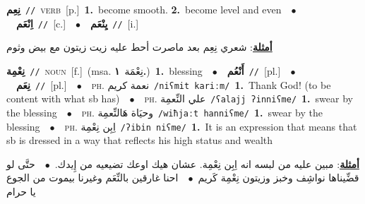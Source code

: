 \documentclass[10pt,a4paper,twoside]{article} %
\begin{document}
\begin{multicols}{2}
{\setlength\topsep{0pt}\textbf{\foreignlanguage{arabic}{نِعِم}}\ {\color{gray}\texttt{//}\color{black}}\ \textsc{verb}\ [p.]\ \textbf{1.}~become smooth.  \textbf{2.}~become level and even\ \ $\bullet$\ \ \setlength\topsep{0pt}\textbf{\foreignlanguage{arabic}{اِنْعَم}}\ {\color{gray}\texttt{//}\color{black}}\ [c.]\ \ $\bullet$\ \ \setlength\topsep{0pt}\textbf{\foreignlanguage{arabic}{يِنْعَم}}\ {\color{gray}\texttt{//}\color{black}}\ [i.]\  \begin{flushright}\color{gray}\foreignlanguage{arabic}{\textbf{\underline{\foreignlanguage{arabic}{أمثلة}}}: شعري نِعِم بعد ماصرت أحط عليه زيت زيتون مع بيض وثوم}\end{flushright}\color{black}} \vspace{2mm}

{\setlength\topsep{0pt}\textbf{\foreignlanguage{arabic}{نِعْمِة}}\ {\color{gray}\texttt{//}\color{black}}\ \textsc{noun}\ [f.]\ \color{gray}(msa. \foreignlanguage{arabic}{نِعْمَة}~\foreignlanguage{arabic}{\textbf{١.}})\color{black}\ \textbf{1.}~blessing\ \ $\bullet$\ \ \setlength\topsep{0pt}\textbf{\foreignlanguage{arabic}{أَنْعُم}}\ {\color{gray}\texttt{//}\color{black}}\ [pl.]\ \ $\bullet$\ \ \setlength\topsep{0pt}\textbf{\foreignlanguage{arabic}{نِعَم}}\ {\color{gray}\texttt{//}\color{black}}\ [pl.]\ \ $\bullet$\ \ \textsc{ph.} \color{gray} \foreignlanguage{arabic}{نعمة كريم}\color{black}\ {\color{gray}\texttt{/{\sffamily niʕmit kariːm}/}\color{black}}\ \textbf{1.}~Thank God! (to be content with what sb has)\ \ $\bullet$\ \ \textsc{ph.} \color{gray} \foreignlanguage{arabic}{علي النِّعمِة}\color{black}\ {\color{gray}\texttt{/{\sffamily ʕalajj ʔinniʕme}/}\color{black}}\ \textbf{1.}~swear by the blessing\ \ $\bullet$\ \ \textsc{ph.} \color{gray} \foreignlanguage{arabic}{وحيَاة هَالنِّعمِة}\color{black}\ {\color{gray}\texttt{/{\sffamily wiħjaːt hanniʕme}/}\color{black}}\ \textbf{1.}~swear by the blessing\ \ $\bullet$\ \ \textsc{ph.} \color{gray} \foreignlanguage{arabic}{اِبِن نِعْمِة}\color{black}\ {\color{gray}\texttt{/{\sffamily ʔibin niʕme}/}\color{black}}\ \textbf{1.}~It is an expression that means that sb is dressed in a way that reflects his high status and wealth\  \begin{flushright}\color{gray}\foreignlanguage{arabic}{\textbf{\underline{\foreignlanguage{arabic}{أمثلة}}}: مبين عليه من لبسه انه اِبِن نِعْمِة. عشان هيك اوعك تضيعيه من إِيدك.\ $\bullet$\ \  حتَّى لو قضِّيناها نواشِف وخبز وزيتون نِعْمِة كَريم\ $\bullet$\ \  احنا غارقين بالنِّعَم وغيرنا بيموت من الجوع يا حرام}\end{flushright}\color{black}} \vspace{2mm}


\end{multicols}
\end{document}
